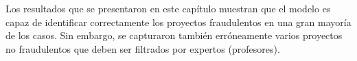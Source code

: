 Los resultados que se presentaron en este capítulo muestran que el modelo es capaz de identificar correctamente los proyectos fraudulentos en una gran mayoría de los casos. Sin embargo, se capturaron también erróneamente varios proyectos no fraudulentos que deben ser filtrados por expertos (profesores).

